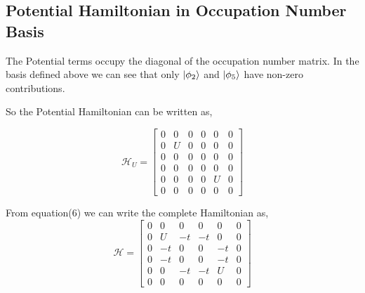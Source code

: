 \documentclass{article}
\begin{document}
\subsection{Potential Hamiltonian in Occupation Number Basis}
The Potential terms occupy the diagonal of the occupation number matrix. In the basis defined above we can see that
only \(\ket{\phi_2} \) and \(\ket{\phi_5}\) have non-zero contributions.

So the Potential Hamiltonian can be written as,

\begin{equation}
  \mathcal{H}_U =
  \begin{bmatrix}
    0 & 0 & 0 & 0 & 0 & 0 \\
    0 & U & 0 & 0 & 0 & 0 \\
    0 & 0 & 0 & 0 & 0 & 0 \\
    0 & 0 & 0 & 0 & 0 & 0 \\
    0 & 0 & 0 & 0 & U & 0 \\
    0 & 0 & 0 & 0 & 0 & 0
  \end{bmatrix}
\end{equation}

From equation(6) we can write the complete Hamiltonian as,
\begin{equation}
  \mathcal{H} =
  \begin{bmatrix}
    0 & 0 & 0 & 0 & 0 & 0   \\
    0 & U & -t & -t & 0 & 0 \\
    0 & -t & 0 & 0 & -t & 0 \\
    0 & -t & 0 & 0 & -t & 0 \\
    0 & 0 & -t & -t & U & 0 \\
    0 & 0 & 0 & 0 & 0 & 0
  \end{bmatrix}
\end{equation}
\end{document}
